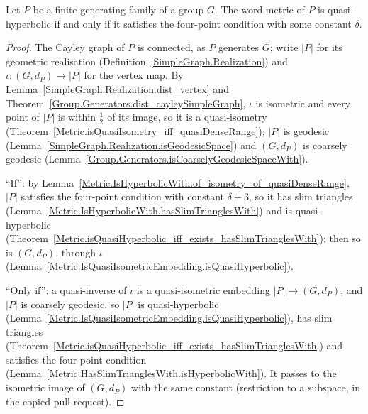 \begin{theorem}
  \label{Group.Generators.isQuasiHyperbolic_iff}
  Let $P$ be a finite generating family of a group $G$. The word metric of $P$ is quasi-hyperbolic
  if and only if it satisfies the four-point condition with some constant $\delta$.
\end{theorem}
\begin{proof}
  The Cayley graph of $P$ is connected, as $P$ generates $G$; write $|P|$ for its geometric
  realisation (Definition~\ref{SimpleGraph.Realization}) and $\iota \colon (G, d_P) \to |P|$ for the
  vertex map. By Lemma~\ref{SimpleGraph.Realization.dist_vertex} and
  Theorem~\ref{Group.Generators.dist_cayleySimpleGraph}, $\iota$ is isometric and every point of
  $|P|$ is within $\frac12$ of its image, so it is a quasi-isometry
  (Theorem~\ref{Metric.isQuasiIsometry_iff_quasiDenseRange}); $|P|$ is geodesic
  (Lemma~\ref{SimpleGraph.Realization.isGeodesicSpace}) and $(G, d_P)$ is coarsely geodesic
  (Lemma~\ref{Group.Generators.isCoarselyGeodesicSpaceWith}).

  ``If'': by Lemma~\ref{Metric.IsHyperbolicWith.of_isometry_of_quasiDenseRange}, $|P|$ satisfies
  the four-point condition with constant $\delta + 3$, so it has slim triangles
  (Lemma~\ref{Metric.IsHyperbolicWith.hasSlimTrianglesWith}) and is quasi-hyperbolic
  (Theorem~\ref{Metric.isQuasiHyperbolic_iff_exists_hasSlimTrianglesWith}); then so is $(G, d_P)$,
  through $\iota$ (Lemma~\ref{Metric.IsQuasiIsometricEmbedding.isQuasiHyperbolic}).

  ``Only if'': a quasi-inverse of $\iota$ is a quasi-isometric embedding $|P| \to (G, d_P)$, and
  $|P|$ is coarsely geodesic, so $|P|$ is quasi-hyperbolic
  (Lemma~\ref{Metric.IsQuasiIsometricEmbedding.isQuasiHyperbolic}), has slim triangles
  (Theorem~\ref{Metric.isQuasiHyperbolic_iff_exists_hasSlimTrianglesWith}) and satisfies the
  four-point condition (Lemma~\ref{Metric.HasSlimTrianglesWith.isHyperbolicWith}). It passes to the
  isometric image of $(G, d_P)$ with the same constant (restriction to a subspace, in the copied
  pull request).
\end{proof}

